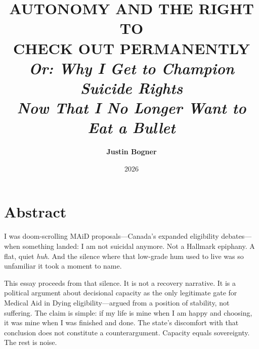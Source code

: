\documentclass[10pt, letterpaper, twocolumn]{article}
\title{\textbf{\LARGE AUTONOMY AND THE RIGHT TO\\ CHECK OUT PERMANENTLY}\\[0.5em]
\large \textit{Or: Why I Get to Champion Suicide Rights\\Now That I No Longer Want to Eat a Bullet}}
\author{\textbf{Justin Bogner}}
\date{2026}
\begin{document}

\section*{Abstract}

I was doom-scrolling MAiD proposals---Canada's expanded eligibility debates---when something landed: I am not suicidal anymore. Not a Hallmark epiphany. A flat, quiet \textit{huh}. And the silence where that low-grade hum used to live was so unfamiliar it took a moment to name.

This essay proceeds from that silence. It is not a recovery narrative. It is a political argument about decisional capacity as the only legitimate gate for Medical Aid in Dying eligibility---argued from a position of stability, not suffering. The claim is simple: if my life is mine when I am happy and choosing, it was mine when I was finished and done. The state's discomfort with that conclusion does not constitute a counterargument. Capacity equals sovereignty. The rest is noise.
\end{document}
